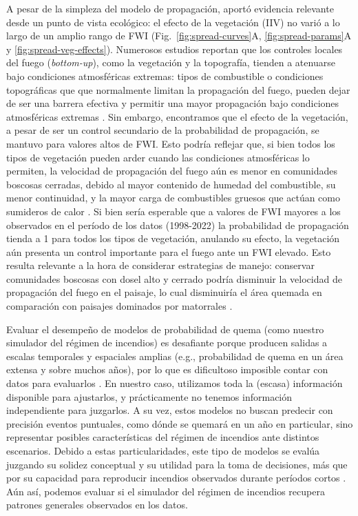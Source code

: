 
A pesar de la simpleza del modelo de propagación, aportó evidencia relevante desde un punto de vista ecológico: el efecto de la vegetación (IIV) no varió a lo largo de un amplio rango de FWI (Fig.~\ref{fig:spread-curves}A, \ref{fig:spread-params}A y \ref{fig:spread-veg-effects}). Numerosos estudios reportan que los controles locales del fuego (\textit{bottom-up}), como la vegetación y la topografía, tienden a atenuarse bajo condiciones atmosféricas extremas: tipos de combustible o condiciones topográficas que que normalmente limitan la propagación del fuego, pueden dejar de ser una barrera efectiva y permitir una mayor propagación bajo condiciones atmosféricas extremas \citep{Podur2009, Parks2015, Collins2019, jones_extreme_2023}. Sin embargo, encontramos que el efecto de la vegetación, a pesar de ser un control secundario de la probabilidad de propagación, se mantuvo para valores altos de FWI. Esto podría reflejar que, si bien todos los tipos de vegetación pueden arder cuando las condiciones atmosféricas lo permiten, la velocidad de propagación del fuego aún es menor en comunidades boscosas cerradas, debido al mayor contenido de humedad del combustible, su menor continuidad, y la mayor carga de combustibles gruesos que actúan como sumideros de calor \citep{zylstra_biophysical_2016}. Si bien sería esperable que a valores de FWI mayores a los observados en el período de los datos (1998-2022) la probabilidad de propagación tienda a 1 para todos los tipos de vegetación, anulando su efecto, la vegetación aún presenta un control importante para el fuego ante un FWI elevado. Esto resulta relevante a la hora de considerar estrategias de manejo: conservar comunidades boscosas con dosel alto y cerrado podría disminuir la velocidad de propagación del fuego en el paisaje, lo cual disminuiría el área quemada en comparación con paisajes dominados por matorrales \citep{tiribelli_non-additive_2019}. 


Evaluar el desempeño de modelos de probabilidad de quema (como nuestro simulador del régimen de incendios) es desafiante porque producen salidas a escalas temporales y espaciales amplias (e.g., probabilidad de quema en un área extensa y sobre muchos años), por lo que es dificultoso imposible contar con datos para evaluarlos \citep{parisien2020commentary}. En nuestro caso, utilizamos toda la (escasa) información disponible para ajustarlos, y prácticamente no tenemos información independiente para juzgarlos. A su vez, estos modelos no buscan predecir con precisión eventos puntuales, como dónde se quemará en un año en particular, sino representar posibles características del régimen de incendios ante distintos escenarios. Debido a estas particularidades, este tipo de modelos se evalúa juzgando su solidez conceptual y su utilidad para la toma de decisiones, más que por su capacidad para reproducir incendios observados durante períodos cortos \citep{parisien2020commentary}. Aún así, podemos evaluar si el simulador del régimen de incendios recupera patrones generales observados en los datos.


